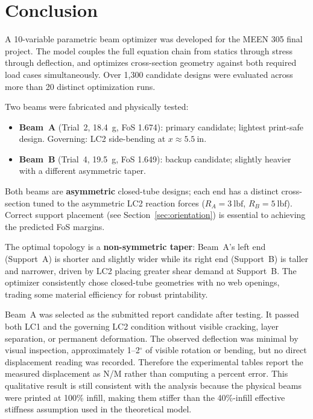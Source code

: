 \documentclass[11pt,letterpaper]{article}
\begin{document}
\section{Conclusion}
\label{sec:conclusion}

A 10-variable parametric beam optimizer was developed for the MEEN 305 final
project.  The model couples the full equation chain from statics through stress
through deflection, and optimizes cross-section geometry against both required
load cases simultaneously.  Over 1{,}300 candidate designs were evaluated across
more than 20 distinct optimization runs.

Two beams were fabricated and physically tested:

\begin{itemize}[noitemsep]
  \item \textbf{Beam~A} (Trial~2, 18.4~g, FoS 1.674): primary candidate; lightest
    print-safe design.  Governing: LC2 side-bending at $x \approx 5.5\ \mathrm{in}$.
  \item \textbf{Beam~B} (Trial~4, 19.5~g, FoS 1.649): backup candidate; slightly
    heavier with a different asymmetric taper.
\end{itemize}

Both beams are \textbf{asymmetric} closed-tube designs; each end has a distinct
cross-section tuned to the asymmetric LC2 reaction forces
($R_A = 3\ \mathrm{lbf}$, $R_B = 5\ \mathrm{lbf}$).  Correct support
placement (see Section~\ref{sec:orientation}) is essential to achieving the
predicted FoS margins.

The optimal topology is a \textbf{non-symmetric taper}: Beam~A's left end
(Support~A) is shorter and slightly wider while its right end (Support~B)
is taller and narrower, driven by LC2 placing greater shear demand at Support~B.
The optimizer consistently chose closed-tube geometries with no web openings,
trading some material efficiency for robust printability.

Beam~A was selected as the submitted report candidate after testing.  It passed
both LC1 and the governing LC2 condition without visible cracking, layer
separation, or permanent deformation.  The observed deflection was minimal by
visual inspection, approximately 1--2$^\circ$ of visible rotation or bending,
but no direct displacement reading was recorded.  Therefore the experimental
tables report the measured displacement as N/M rather than computing a percent
error.  This qualitative result is still consistent with the analysis because
the physical beams were printed at 100\% infill, making them stiffer than the
40\%-infill effective stiffness assumption used in the theoretical model.
\end{document}
